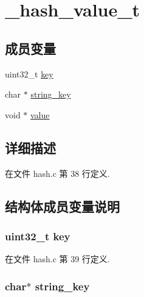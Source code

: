 \hypertarget{struct__hash__value__t}{}\section{\+\_\+hash\+\_\+value\+\_\+t}
\label{struct__hash__value__t}
\subsection*{成员变量}
\begin{DoxyCompactItemize}
\item 
uint32\+\_\+t \hyperlink{struct__hash__value__t_a6d4ec8e4f3148d51041635da9986c3fa}{key}
\item 
char $\ast$ \hyperlink{struct__hash__value__t_a8e0eadb0646365a5553dced64114b083}{string\+\_\+key}
\item 
void $\ast$ \hyperlink{struct__hash__value__t_a0f61d63b009d0880a89c843bd50d8d76}{value}
\end{DoxyCompactItemize}


\subsection{详细描述}


在文件 hash.\+c 第 38 行定义.



\subsection{结构体成员变量说明}
\hypertarget{struct__hash__value__t_a6d4ec8e4f3148d51041635da9986c3fa}{}
\subsubsection[{key}]{\setlength{\rightskip}{0pt plus 5cm}uint32\+\_\+t key}\label{struct__hash__value__t_a6d4ec8e4f3148d51041635da9986c3fa}


在文件 hash.\+c 第 39 行定义.

\hypertarget{struct__hash__value__t_a8e0eadb0646365a5553dced64114b083}{}
\subsubsection[{string\+\_\+key}]{\setlength{\rightskip}{0pt plus 5cm}char$\ast$ string\+\_\+key}\label{struct__hash__value__t_a8e0eadb0646365a5553dced64114b083}



